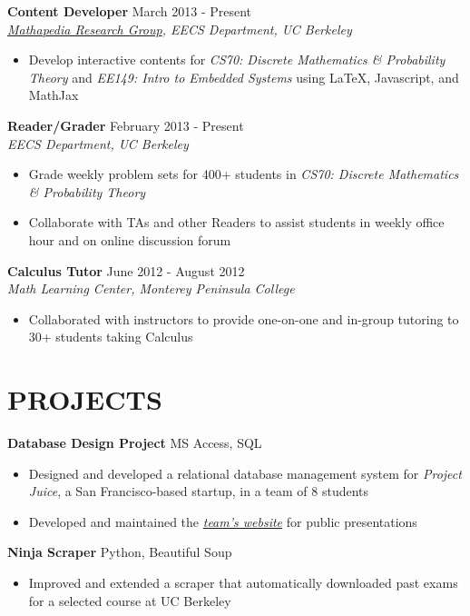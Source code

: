 \documentclass[margin]{res}
\begin{document}
\begin{resume}
\textbf{Content Developer} \hfill March 2013 - Present \\
\textit{\href{https://mathapedia.com/}{Mathapedia Research Group}, EECS Department, UC Berkeley} \smallskip
\begin{itemize}[leftmargin=10pt]
\item Develop interactive contents for \textit{CS70: Discrete Mathematics \& Probability Theory} and \textit{EE149: Intro to Embedded Systems} using \LaTeX{}, Javascript, and MathJax
\end{itemize}

\textbf{Reader/Grader} \hfill February 2013 - Present\\
\textit{EECS Department, UC Berkeley} \smallskip
\begin{itemize}[leftmargin=10pt]
\item Grade weekly problem sets for 400+ students in \textit{CS70: Discrete Mathematics \& Probability Theory}
\item Collaborate with TAs and other Readers to assist students in weekly office hour and on online discussion forum 
\end{itemize}

\textbf{Calculus Tutor} \hfill June 2012 - August 2012 \\
\textit{Math Learning Center, Monterey Peninsula College} \smallskip
\begin{itemize}[leftmargin=10pt]
\item Collaborated with instructors to provide one-on-one and in-group tutoring to 30+ students taking Calculus
\end{itemize}

\section{PROJECTS} 
\textbf{Database Design Project} \hfill MS Access, SQL
\begin{itemize}[leftmargin=10pt]
\item Designed and developed a relational database management system for \textit{Project Juice}, a San Francisco-based startup, in a team of 8 students
\item Developed and maintained the {\href{http://kqdtran.github.io/ieor115/slide.html}{\textit{team's website}}} for public presentations
\end{itemize}

\textbf{Ninja Scraper} \hfill Python, Beautiful Soup
\begin{itemize}[leftmargin=10pt]
\item Improved and extended a scraper that automatically downloaded past exams for a selected course at UC Berkeley
\end{itemize}


\end{resume}
\end{document}
